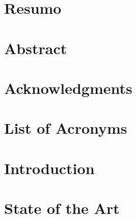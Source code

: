 \documentclass[12pt,a4paper,twoside]{book} %
\begin{document}
  

\thispagestyle{plain}

\newpage
\thispagestyle{plain}

\chapter*{Resumo}

\newpage
\thispagestyle{plain}

\chapter*{Abstract}

\newpage
\thispagestyle{plain}

\chapter*{Acknowledgments}

\newpage
\thispagestyle{plain}

\tableofcontents{}
\thispagestyle{plain}

\listoffigures
\newpage
\thispagestyle{plain}

\listoftables
\newpage
\thispagestyle{plain}

  
\chapter*{List of Acronyms}

\newpage
\thispagestyle{plain}
\cleardoublepage
  
  \acresetall
  
  \chapter{Introduction}
  \label{chap:intro}
  

  \chapter{State of the Art}
  \label{chap:state_art}
  
\end{document}
